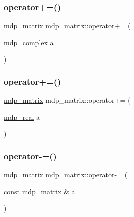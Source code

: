 \mbox{\label{classmdp__matrix_a1021c838b49375a54f533fa97e27b742}} 
\subsubsection{\texorpdfstring{operator+=()}{operator+=()}\hspace{0.1cm}{\footnotesize\ttfamily [2/3]}}
{\footnotesize\ttfamily \hyperlink{classmdp__matrix}{mdp\+\_\+matrix} mdp\+\_\+matrix\+::operator+= (\begin{DoxyParamCaption}\item[{\hyperlink{classmdp__complex}{mdp\+\_\+complex}}]{a }\end{DoxyParamCaption})\hspace{0.3cm}{\ttfamily [inline]}}

\mbox{\label{classmdp__matrix_ae2bc2fbd5f22c9a5255995710ca30c35}} 
\subsubsection{\texorpdfstring{operator+=()}{operator+=()}\hspace{0.1cm}{\footnotesize\ttfamily [3/3]}}
{\footnotesize\ttfamily \hyperlink{classmdp__matrix}{mdp\+\_\+matrix} mdp\+\_\+matrix\+::operator+= (\begin{DoxyParamCaption}\item[{\hyperlink{mdp__global__vars_8h_a69d96b74c791e0bbdb888b3913a69450}{mdp\+\_\+real}}]{a }\end{DoxyParamCaption})\hspace{0.3cm}{\ttfamily [inline]}}

\mbox{\label{classmdp__matrix_aaceb320e98a01a83350685591657861f}} 
\subsubsection{\texorpdfstring{operator-\/=()}{operator-=()}\hspace{0.1cm}{\footnotesize\ttfamily [1/3]}}
{\footnotesize\ttfamily \hyperlink{classmdp__matrix}{mdp\+\_\+matrix} mdp\+\_\+matrix\+::operator-\/= (\begin{DoxyParamCaption}\item[{const \hyperlink{classmdp__matrix}{mdp\+\_\+matrix} \&}]{a }\end{DoxyParamCaption})\hspace{0.3cm}{\ttfamily [inline]}}

